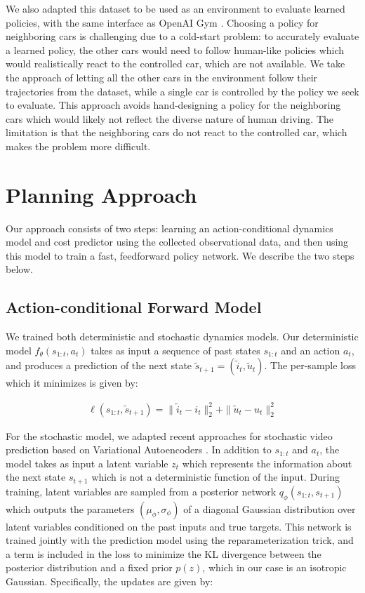 \documentclass{article} %
\begin{document}
We also adapted this dataset to be used as an environment to evaluate learned policies, with the same interface as OpenAI Gym \citep{OpenAIBaselines}.
Choosing a policy for neighboring cars is challenging due to a cold-start problem: to accurately evaluate a learned policy, the other cars would need to follow human-like policies which would realistically react to the controlled car, which are not available.
We take the approach of letting all the other cars in the environment follow their trajectories from the dataset, while a single car is controlled by the policy we seek to evaluate.
This approach avoids hand-designing a policy for the neighboring cars which would likely not reflect the diverse nature of human driving.
The limitation is that the neighboring cars do not react to the controlled car, which makes the problem more difficult.


\section{Planning Approach}

Our approach consists of two steps: learning an action-conditional dynamics model and cost predictor using the collected observational data, and then using this model to train a fast, feedforward policy network. We describe the two steps below.

\subsection{Action-conditional Forward Model}

We trained both deterministic and stochastic dynamics models.
Our deterministic model $f_\theta(s_{1:t}, a_t)$ takes as input a sequence of past states $s_{1:t}$ and an action $a_t$, and produces a prediction of the next state $\tilde{s}_{t+1} = (\tilde{i}_t, \tilde{u}_t)$.  
The per-sample loss which it minimizes is given by:

\begin{align}
  \label{eq:update-eqn}
  \ell(s_{1:t}, \tilde{s}_{t+1}) = \|\tilde{i}_t - i_t \|_2^2 + \| \tilde{u}_t - u_t \|_2^2
\end{align}


For the stochastic model, we adapted recent approaches for stochastic video prediction \citep{Babaeizadeh2018, Denton2018} based on Variational Autoencoders \citep{VAE}.
In addition to $s_{1:t}$ and $a_t$, the model takes as input a latent variable $z_t$ which represents the information about the next state $s_{t+1}$ which is not a deterministic function of the input.
During training, latent variables are sampled from a posterior network $q_\phi(s_{1:t}, s_{t+1})$ which outputs the parameters $(\mu_\phi, \sigma_\phi)$ of a diagonal Gaussian distribution over latent variables conditioned on the past inputs and true targets. This network is trained jointly with the prediction model using the reparameterization trick, and a term is included in the loss to minimize the KL divergence between the posterior distribution and a fixed prior $p(z)$, which in our case is an isotropic Gaussian.
Specifically, the updates are given by:
\end{document}
